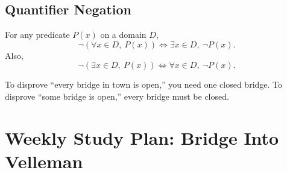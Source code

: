 \documentclass[11pt]{article}
\begin{document}
\subsection{Quantifier Negation}

\begin{theorem}
For any predicate $P(x)$ on a domain $D$,
\[
\neg(\forall x\in D,\ P(x)) \Longleftrightarrow \exists x\in D,\ \neg P(x).
\]
Also,
\[
\neg(\exists x\in D,\ P(x)) \Longleftrightarrow \forall x\in D,\ \neg P(x).
\]
\end{theorem}

\begin{intuitionbox}
To disprove ``every bridge in town is open,'' you need one closed bridge. To disprove ``some bridge is open,'' every bridge must be closed.
\end{intuitionbox}

\section{Weekly Study Plan: Bridge Into Velleman}
\end{document}

